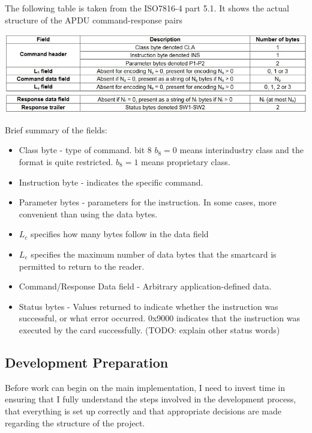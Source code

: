 \documentclass[12pt]{article}
\begin{document}
The following table is taken from the ISO7816-4 part 5.1. It shows the actual structure of the APDU command-response pairs

\includegraphics[scale=0.7]{introduction/apdus}

Brief summary of the fields:

\begin{itemize}
	\item  Class byte - type of command. bit 8 $b_8=0$ means interindustry class and the format is quite restricted. $b_8=1$ means proprietary class.
	
	\item Instruction byte - indicates the specific command.
	
	\item Parameter bytes - parameters for the instruction. In some cases, more convenient than using the data bytes.
	
	\item $L_c$ specifies how many bytes follow in the data field
	
	\item $L_e$ specifies the maximum number of data bytes that the smartcard is permitted to return to the reader.
	
	\item Command/Response Data field - Arbitrary application-defined data.
	
	\item Status bytes - Values returned to indicate whether the instruction was successful, or what error occurred. 0x9000 indicates that the instruction was executed by the card successfully. (TODO: explain other status words)
\end{itemize}





\subsection{Development Preparation}
Before work can begin on the main implementation, I need to invest time in ensuring that I fully understand the steps involved in the development process, that everything is set up correctly and that appropriate decisions are made regarding the structure of the project.
\end{document}
